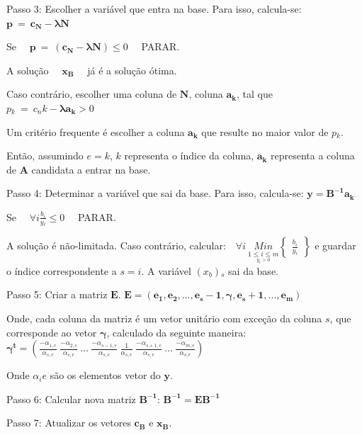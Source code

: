 Passo 3: Escolher a variável que entra na base. Para isso, calcula-se: $\mathbf{p}\ =\ \mathbf{c{_N}}-\mathbf{\lambda N}$

Se \ \ $\mathbf{p}\ =\ (\mathbf{c{_N}}-\mathbf{\lambda N})\leq 0$ \ \ PARAR.

A solução \ \ $\mathbf{x{_B}}$ \ \ já é a solução ótima. 

Caso contrário, escolher uma coluna de $\mathbf{N}$, coluna $\mathbf{a{_k}}$, tal que $\mathit{p{_k}}\ =\ \mathit{c{_nk}}-\mathbf{\lambda a{_k}}> 0$

Um critério frequente é escolher a coluna $\mathbf{a{_k}}$ que resulte no maior valor de $\mathit{p{_k}}$.

Então, assumindo $\mathit{e} = \mathit{k}$, $\mathit{k}$ representa o índice da coluna, $\mathbf{a{_k}}$ representa a coluna de $\mathbf{A}$ candidata a entrar na base. 

Passo 4: Determinar a variável que sai da base. Para isso, calcula-se: $\mathbf{y}=\mathbf{B^{-1}a{_k}}$

Se \ \ $\forall i\mathit{\frac{b{_i}}{y{_i}}}\leq 0$ \ \ PARAR.

A solução é não-limitada. Caso contrário, calcular:\ \ 
$\forall i\ \underset{\underset{y{_i}>0}{1\leq i\leq m}}{Min}\begin{Bmatrix}
\mathit{\frac{b{_i}}{y{_i}}}
\end{Bmatrix}$ e guardar o índice correspondente a $s = i$. A variável $(x{_b}){_s}$ sai da base.

Passo 5: Criar a matriz $\mathbf{E}$.
$\mathbf{E}=(\mathbf{e{_1}},\mathbf{e{_2}},...,\mathbf{e{_s-1}},\mathbf{\gamma} , \mathbf{e{_s+1}},...,\mathbf{e{_m}})$

Onde, cada coluna da matriz é um vetor unitário com exceção da coluna $\mathit{s}$, que corresponde ao vetor $\mathbf{\gamma}$, calculado da seguinte maneira: \\
$\mathbf{\gamma^{t}}=\left( \mathit{\frac{-\alpha {_{1,e}}}{\alpha {_{s,e}}}}\ \mathit{\frac{-\alpha {_{2,e}}}{\alpha {_{s,e}}}}\ ...\ \mathit{\frac{-\alpha {_{s-1,e}}}{\alpha {_{s,e}}}}\ \mathit{\frac{1}{\alpha {_{s,e}}}\ \frac{-\alpha {_{s+1,e}}}{\alpha {_{s,e}}}}\ ...\ \mathit{\frac{-\alpha {_{m,e}}}{\alpha {_{s,e}}}} \right )$

Onde $\mathit{\alpha{_ie}}$ são os elementos vetor do $\mathbf{y}$.

Passo 6: Calcular nova matriz $\mathbf{B^{-1}}$: $\mathbf{B^{-1}} = \mathbf{EB^{-1}}$

Passo 7: Atualizar os vetores $\mathbf{c{_B}}$ e $\mathbf{x{_B}}$.

